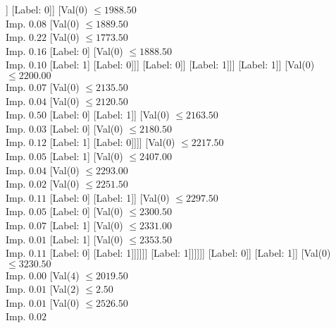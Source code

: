 \documentclass[margin=10pt]{standalone}
\begin{document}
\begin{forest}
															[Label: 0]
															[Label: 1]]
														[Label: 0]]
													[Val($0$) $ \leq 1988.50$ \\ Imp. $0.08$
														[Val($0$) $ \leq 1889.50$ \\ Imp. $0.22$
															[Val($0$) $ \leq 1773.50$ \\ Imp. $0.16$
																[Label: 0]
																[Val($0$) $ \leq 1888.50$ \\ Imp. $0.10$
																	[Label: 1]
																	[Label: 0]]]
															[Label: 0]]
														[Label: 1]]]
												[Label: 1]]
											[Val($0$) $ \leq 2200.00$ \\ Imp. $0.07$
												[Val($0$) $ \leq 2135.50$ \\ Imp. $0.04$
													[Val($0$) $ \leq 2120.50$ \\ Imp. $0.50$
														[Label: 0]
														[Label: 1]]
													[Val($0$) $ \leq 2163.50$ \\ Imp. $0.03$
														[Label: 0]
														[Val($0$) $ \leq 2180.50$ \\ Imp. $0.12$
															[Label: 1]
															[Label: 0]]]]
												[Val($0$) $ \leq 2217.50$ \\ Imp. $0.05$
													[Label: 1]
													[Val($0$) $ \leq 2407.00$ \\ Imp. $0.04$
														[Val($0$) $ \leq 2293.00$ \\ Imp. $0.02$
															[Val($0$) $ \leq 2251.50$ \\ Imp. $0.11$
																[Label: 0]
																[Label: 1]]
															[Val($0$) $ \leq 2297.50$ \\ Imp. $0.05$
																[Label: 0]
																[Val($0$) $ \leq 2300.50$ \\ Imp. $0.07$
																	[Label: 1]
																	[Val($0$) $ \leq 2331.00$ \\ Imp. $0.01$
																		[Label: 1]
																		[Val($0$) $ \leq 2353.50$ \\ Imp. $0.11$
																			[Label: 0]
																			[Label: 1]]]]]]
														[Label: 1]]]]]]
									[Label: 0]]
								[Label: 1]]
							[Val($0$) $ \leq 3230.50$ \\ Imp. $0.00$
								[Val($4$) $ \leq 2019.50$ \\ Imp. $0.01$
									[Val($2$) $ \leq 2.50$ \\ Imp. $0.01$
										[Val($0$) $ \leq 2526.50$ \\ Imp. $0.02$

\end{forest}
\end{document}
